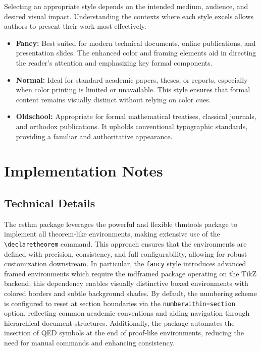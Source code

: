 \documentclass[10pt,letterpaper]{amsart}
\begin{document}
Selecting an appropriate style depends on the intended medium, audience, and
desired visual impact. Understanding the contexts where each style excels
allows authors to present their work most effectively.

\begin{itemize}[label={--}]
	\item \textbf{Fancy:} Best suited for modern technical documents, online publications, and presentation slides. The enhanced color and framing elements aid in directing the reader's attention and emphasizing key formal components.
	\item \textbf{Normal:} Ideal for standard academic papers, theses, or reports, especially when color printing is limited or unavailable. This style ensures that formal content remains visually distinct without relying on color cues.
	\item \textbf{Oldschool:} Appropriate for formal mathematical treatises, classical journals, and orthodox publications. It upholds conventional typographic standards, providing a familiar and authoritative appearance.
\end{itemize}

\section{Implementation Notes}

\subsection{Technical Details}

The \textsf{csthm} package leverages the powerful and flexible
\textsf{thmtools} package to implement all theorem-like environments, making
extensive use of the \verb|\declaretheorem| command. This approach ensures that
the environments are defined with precision, consistency, and full
configurability, allowing for robust customization downstream. In particular,
the \texttt{fancy} style introduces advanced framed environments which require
the \textsf{mdframed} package operating on the \textsf{TikZ} backend; this
dependency enables visually distinctive boxed environments with colored borders
and subtle background shades. By default, the numbering scheme is configured to
reset at section boundaries via the \texttt{numberwithin=section} option,
reflecting common academic conventions and aiding navigation through
hierarchical document structures. Additionally, the package automates the
insertion of QED symbols at the end of proof-like environments, reducing the
need for manual commands and enhancing consistency.
\end{document}
